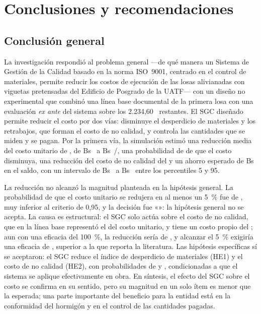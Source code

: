 \chapter*{Conclusiones y recomendaciones}
\setcounter{section}{0}
\renewcommand{\thesection}{\arabic{section}}

\section{Conclusión general}

La investigación respondió al problema general ---de qué manera un Sistema de Gestión de la Calidad basado en la norma ISO~9001, centrado en el control de materiales, permite reducir los costos de ejecución de las losas alivianadas con viguetas pretensadas del Edificio de Posgrado de la UATF--- con un diseño no experimental que combinó una línea base documental de la primera losa con una evaluación \emph{ex ante} del sistema sobre los 2.234,60~\mdos{} restantes. El SGC diseñado permite reducir el costo por dos vías: disminuye el desperdicio de materiales y los retrabajos, que forman el costo de no calidad, y controla las cantidades que se miden y se pagan. Por la primera vía, la simulación estimó una reducción media del costo unitario de \rMedia{}, de Bs~\CUsinMedia{} a Bs~\CUconMedia/\mdos{}, una probabilidad de \PRpos{} de que el costo disminuya, una reducción del costo de no calidad del \CNCreduccionPct{} y un ahorro esperado de Bs~\AhorroMedia{} en el saldo, con un intervalo de Bs~\AhorroPcinco{} a Bs~\AhorroPnoventaycinco{} entre los percentiles 5 y 95.

La reducción no alcanzó la magnitud planteada en la hipótesis general. La probabilidad de que el costo unitario se redujera en al menos un 5~\% fue de \PHG{}, muy inferior al criterio de 0,95, y la decisión fue «\DecHG»: la hipótesis general no se acepta. La causa es estructural: el SGC solo actúa sobre el costo de no calidad, que en la línea base representó el \CNCsinDetPct{} del costo unitario, y tiene un costo propio del \CCconDetPct{}; aun con una eficacia del 100~\%, la reducción sería de \rMaxTeorico{}, y alcanzar el 5~\% exigiría una eficacia de \KequilibrioUmbral{}, superior a la que reporta la literatura. Las hipótesis específicas sí se aceptaron: el SGC reduce el índice de desperdicio de materiales (HE1) y el costo de no calidad (HE2), con probabilidades de \PHEuno{} y \PHEdos{}, condicionadas a que el sistema se aplique efectivamente en obra. En síntesis, el efecto del SGC sobre el costo se confirma en su sentido, pero su magnitud en un solo ítem es menor que la esperada; una parte importante del beneficio para la entidad está en la conformidad del hormigón y en el control de las cantidades pagadas.

